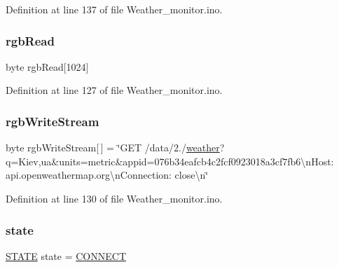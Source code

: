 Definition at line 137 of file Weather\+\_\+monitor.\+ino.

\mbox{\label{_weather__monitor_8ino_a1703b63154dd86de08d67defb88863c0}} 
\subsubsection{\texorpdfstring{rgb\+Read}{rgbRead}}
{\footnotesize\ttfamily byte rgb\+Read\mbox{[}1024\mbox{]}}



Definition at line 127 of file Weather\+\_\+monitor.\+ino.

\mbox{\label{_weather__monitor_8ino_a0990cd80a9c34e96dafbc001af446b06}} 
\subsubsection{\texorpdfstring{rgb\+Write\+Stream}{rgbWriteStream}}
{\footnotesize\ttfamily byte rgb\+Write\+Stream\mbox{[}$\,$\mbox{]} = \char`\"{}G\+ET /data/2./\hyperlink{_weather__monitor_8ino_a3f5ff30909a7914cb8eb33a054f67722}{weather}?q=Kiev,ua\&units=metric\&appid=076b34eafcb4c2fcf0923018a3cf7fb6\textbackslash{}n\+Host\+: api.\+openweathermap.\+org\textbackslash{}n\+Connection\+: close\textbackslash{}n\char`\"{}}



Definition at line 130 of file Weather\+\_\+monitor.\+ino.

\mbox{\label{_weather__monitor_8ino_a390ef51e2cfd455504254347218a71ca}} 
\subsubsection{\texorpdfstring{state}{state}}
{\footnotesize\ttfamily \hyperlink{_weather__monitor_8ino_a275a67132f10277ada3a0ee3d616b647}{S\+T\+A\+TE} state = \hyperlink{_weather__monitor_8ino_a275a67132f10277ada3a0ee3d616b647a20391dd2915a0e64343d24c2f2e40b95}{C\+O\+N\+N\+E\+CT}}



